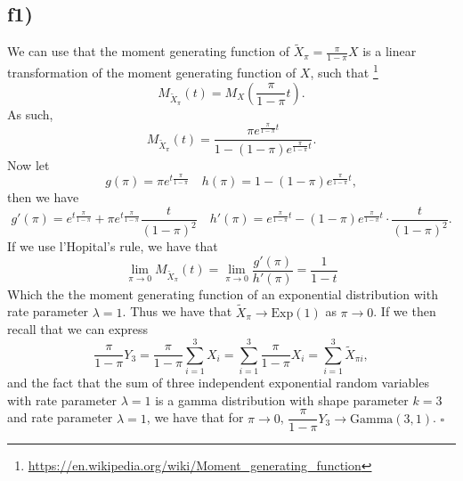 \documentclass{article}
\theoremstyle{definition}
\theoremstyle{remark}
\begin{document}
\subsection*{f1)}
We can use that the moment generating function of $\tilde{X}_\pi = \frac{\pi}{1 - \pi}X$ is a linear transformation of the moment generating function of $X$, such that \footnote{\url{https://en.wikipedia.org/wiki/Moment_generating_function}}
\begin{equation}
    M_{\tilde{X}_\pi}(t) = M_{X}(\dfrac{\pi}{1 - \pi}t).
\end{equation}
As such,
\begin{equation}
    M_{\tilde{X}_\pi}(t) = \dfrac{\pi e^{\frac{\pi}{1 - \pi}t}}{1 - (1 - \pi)e^{\frac{\pi}{1 - \pi}t}}.
\end{equation}
Now let
$$g(\pi) = \pi e^{t\frac{\pi}{1 - \pi}} \quad h(\pi) = 1 - (1 - \pi)e^{\frac{\pi}{1 - \pi}t},$$
then we have
$$g'(\pi) = e^{t\frac{\pi}{1 - \pi}} +\pi e^{t\frac{\pi}{1 - \pi}}\dfrac{t}{(1 - \pi)^2} \quad h'(\pi) =  e^{\frac{\pi}{1 - \pi}t} - (1 - \pi)e^{\frac{\pi}{1 - \pi}t} \cdot \frac{t}{(1 - \pi)^2}.$$
If we use l'Hopital's rule, we have that
\begin{equation}
    \lim_{\pi \to 0} M_{\tilde{X}_\pi}(t) = \lim_{\pi \to 0} \dfrac{g'(\pi)}{h'(\pi)} = \dfrac{1}{1-t} 
\end{equation}
Which the the moment generating function of an exponential distribution with rate parameter $\lambda = 1$. Thus we have that $\tilde{X}_\pi \to \text{Exp}(1)$ as $\pi \to 0$. If we then recall that we can express 
\begin{equation}
    \dfrac{\pi}{1-\pi}Y_3 = \dfrac{\pi}{1-\pi}\sum_{i=1}^{3}X_i = \sum_{i=1}^{3}\dfrac{\pi}{1-\pi}X_i = \sum_{i=1}^{3}\tilde{X}_{\pi i},
\end{equation}
and the fact that the sum of three independent exponential random variables with rate parameter $\lambda = 1$ is a gamma distribution with shape parameter $k = 3$ and rate parameter $\lambda = 1$, we have that for $\pi \to 0$, $\dfrac{\pi}{1-\pi}Y_3 \to \text{Gamma}(3, 1)$. $\square$
\end{document}
